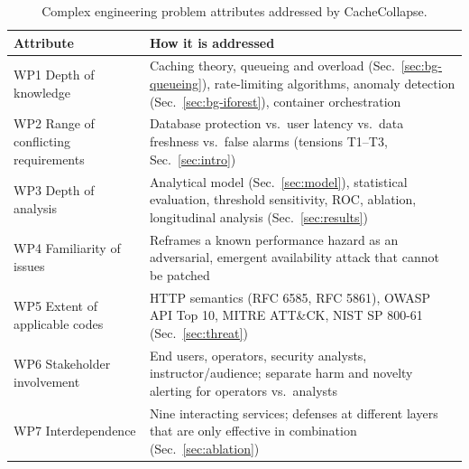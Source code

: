 \documentclass[preprint,12pt]{elsarticle}
\begin{document}
\begin{table}[h]
\centering
\caption{Complex engineering problem attributes addressed by CacheCollapse.}
\label{tab:cep}
\footnotesize
\begin{tabularx}{\linewidth}{@{}L{3.6cm}Y@{}}
\toprule
Attribute & How it is addressed \\
\midrule
WP1 Depth of knowledge & Caching theory, queueing and overload (Sec.~\ref{sec:bg-queueing}), rate-limiting algorithms, anomaly detection (Sec.~\ref{sec:bg-iforest}), container orchestration \\
WP2 Range of conflicting requirements & Database protection vs.\ user latency vs.\ data freshness vs.\ false alarms (tensions T1--T3, Sec.~\ref{sec:intro}) \\
WP3 Depth of analysis & Analytical model (Sec.~\ref{sec:model}), statistical evaluation, threshold sensitivity, ROC, ablation, longitudinal analysis (Sec.~\ref{sec:results}) \\
WP4 Familiarity of issues & Reframes a known performance hazard as an adversarial, emergent availability attack that cannot be patched \\
WP5 Extent of applicable codes & HTTP semantics (RFC 6585, RFC 5861), OWASP API Top 10, MITRE ATT\&CK, NIST SP 800-61 (Sec.~\ref{sec:threat}) \\
WP6 Stakeholder involvement & End users, operators, security analysts, instructor/audience; separate harm and novelty alerting for operators vs.\ analysts \\
WP7 Interdependence & Nine interacting services; defenses at different layers that are only effective in combination (Sec.~\ref{sec:ablation}) \\
\bottomrule
\end{tabularx}
\end{table}
\end{document}
